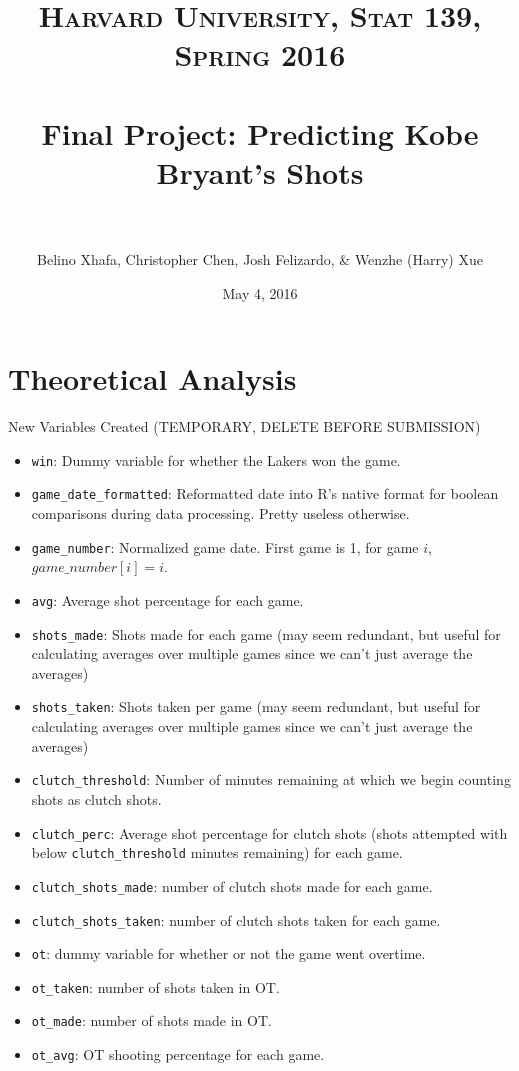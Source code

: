 \documentclass[paper=a4, fontsize=11pt]{scrartcl} %
\title{ 
\normalfont \normalsize 
\textsc{Harvard University, Stat 139, Spring 2016} \\ [25pt] %
\horrule{0.5pt} \\[0.4cm] %
\huge Final Project: Predicting Kobe Bryant's Shots \\ %
\horrule{2pt} \\[0.5cm] %
}
\author{Belino Xhafa, Christopher Chen, Josh Felizardo, \& Wenzhe (Harry) Xue}
\date{\normalsize May 4, 2016} %
\numberwithin{equation}{section} %
\numberwithin{figure}{section} %
\numberwithin{table}{section} %
\begin{document}
\maketitle %

\section{Theoretical Analysis}

\begin{mdframed}[style=MyFrame ]
\begin{center}New Variables Created (TEMPORARY, DELETE BEFORE SUBMISSION)\end{center}
\end{mdframed}
\begin{itemize}
\item \texttt{win}: Dummy variable for whether the Lakers won the game.
\item \texttt{game\_date\_formatted}: Reformatted date into R's native format for boolean comparisons during data processing. Pretty useless otherwise.
\item \texttt{game\_number}: Normalized game date. First game is 1, for game $i$, $game\_number[i] = i$.
\item \texttt{avg}: Average shot percentage for each game.
\item \texttt{shots\_made}: Shots made for each game (may seem redundant, but useful for calculating averages over multiple games since we can't just average the averages)
\item \texttt{shots\_taken}: Shots taken per game (may seem redundant, but useful for calculating averages over multiple games since we can't just average the averages)
\item \texttt{clutch\_threshold}: Number of minutes remaining at which we begin counting shots as clutch shots.
\item \texttt{clutch\_perc}: Average shot percentage for clutch shots (shots attempted with below \texttt{clutch\_threshold} minutes remaining) for each game.
\item \texttt{clutch\_shots\_made}: number of clutch shots made for each game.
\item \texttt{clutch\_shots\_taken}: number of clutch shots taken for each game. 
\item \texttt{ot}: dummy variable for whether or not the game went overtime.
\item \texttt{ot\_taken}: number of shots taken in OT.
\item \texttt{ot\_made}: number of shots made in OT.
\item \texttt{ot\_avg}: OT shooting percentage for each game.
\end{itemize}
\end{document}
